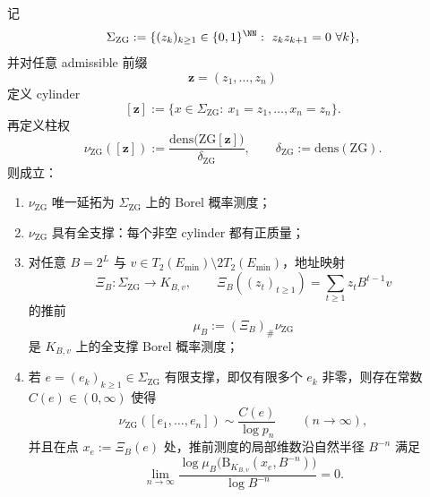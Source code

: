\begin{theorem}\label{thm:xi-time-part60f-zg-cylinder-measure-local-dimension-zero}
记
\[
\Sigma_{\mathrm{ZG}}
:=
\{(z_k)_{k\ge 1}\in\{0,1\}^{\NN}:\ z_kz_{k+1}=0\ \forall k\},
\]
并对任意 admissible 前缀
\[
\mathbf z=(z_1,\dots,z_n)
\]
定义 cylinder
\[
[\mathbf z]
:=
\{x\in\Sigma_{\mathrm{ZG}}:\ x_1=z_1,\dots,x_n=z_n\}.
\]
再定义柱权
\[
\nu_{\mathrm{ZG}}([\mathbf z])
:=
\frac{\mathrm{dens}\bigl(\mathrm{ZG}[\mathbf z]\bigr)}{\delta_{\mathrm{ZG}}},
\qquad
\delta_{\mathrm{ZG}}:=\mathrm{dens}(\mathrm{ZG}).
\]
则成立：
\begin{enumerate}
  \item \(\nu_{\mathrm{ZG}}\) 唯一延拓为 \(\Sigma_{\mathrm{ZG}}\) 上的 Borel 概率测度；
  \item \(\nu_{\mathrm{ZG}}\) 具有全支撑：每个非空 cylinder 都有正质量；
  \item 对任意 \(B=2^L\) 与 \(v\in T_2(E_{\min})\setminus 2T_2(E_{\min})\)，地址映射
  \[
  \Xi_B:\Sigma_{\mathrm{ZG}}\to K_{B,v},
  \qquad
  \Xi_B((z_t)_{t\ge 1})=\sum_{t\ge 1}z_tB^{t-1}v
  \]
  的推前
  \[
  \mu_{B}:=(\Xi_B)_\#\nu_{\mathrm{ZG}}
  \]
  是 \(K_{B,v}\) 上的全支撑 Borel 概率测度；
  \item 若 \(e=(e_k)_{k\ge 1}\in\Sigma_{\mathrm{ZG}}\) 有限支撑，即仅有限多个 \(e_k\) 非零，则存在常数 \(C(e)\in(0,\infty)\) 使得
  \[
  \nu_{\mathrm{ZG}}([e_1,\dots,e_n])
  \sim
  \frac{C(e)}{\log p_n}
  \qquad(n\to\infty),
  \]
  并且在点 \(x_e:=\Xi_B(e)\) 处，推前测度的局部维数沿自然半径 \(B^{-n}\) 满足
  \[
  \lim_{n\to\infty}
  \frac{\log \mu_B\bigl(\mathrm B_{K_{B,v}}(x_e,B^{-n})\bigr)}
       {\log B^{-n}}
  =0.
  \]
\end{enumerate}
\end{theorem}
